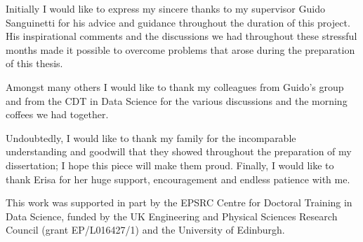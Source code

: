 \begin{acknowledgements}
Initially I would like to express my sincere thanks to my supervisor Guido Sanguinetti for his advice and guidance throughout the duration of this project. His inspirational comments and the discussions we had throughout these stressful months made it possible to overcome problems that arose during the preparation of this thesis.

Amongst many others I would like to thank my colleagues from Guido's group and from the CDT in Data Science for the various discussions and the morning coffees we had together.

Undoubtedly, I would like to thank my family for the incomparable understanding and goodwill that they showed throughout the preparation of my dissertation; I hope this piece will make them proud. Finally, I would like to thank Erisa for her huge support, encouragement and endless patience with me.

This work was supported in part by the EPSRC Centre for Doctoral Training in Data Science, funded by the UK Engineering and Physical Sciences Research Council (grant EP/L016427/1) and the University of Edinburgh.

\end{acknowledgements}